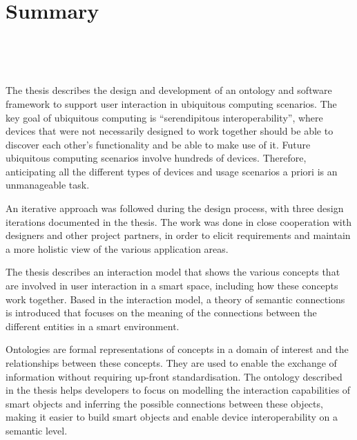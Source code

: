 \cleardoublepage
\pagestyle{empty}

\begingroup
\let\clearpage\relax
\let\cleardoublepage\relax
\let\cleardoublepage\relax

\chapter*{Summary}

\begingroup
    \spacedallcaps{\myTitle} \\ 
\endgroup

\begingroup
\noindent
\spacedlowsmallcaps{\mySubtitle}\\ \bigskip
\endgroup

The thesis describes the design and development of an ontology and software framework to support user interaction in ubiquitous computing scenarios. The key goal of ubiquitous computing is ``serendipitous interoperability'', where devices that were not necessarily designed to work together should be able to discover each other's functionality and be able to make use of it. Future ubiquitous computing scenarios involve hundreds of devices. Therefore, anticipating all the different types of devices and usage scenarios a priori is an unmanageable task.

An iterative approach was followed during the design process, with three design iterations documented in the thesis. The work was done in close cooperation with designers and other project partners, in order to elicit requirements and maintain a more holistic view of the various application areas.
 
The thesis describes an interaction model that shows the various concepts that are involved in user interaction in a smart space, including how these concepts work together. Based in the interaction model, a theory of semantic connections is introduced that focuses on the meaning of the connections between the different entities in a smart environment.

Ontologies are formal representations of concepts in a domain of interest and the relationships between these concepts. They are used to enable the exchange of information without requiring up-front standardisation. The ontology described in the thesis helps developers to focus on modelling the interaction capabilities of smart objects and inferring the possible connections between these objects, making it easier to build smart objects and enable device interoperability on a semantic level.

